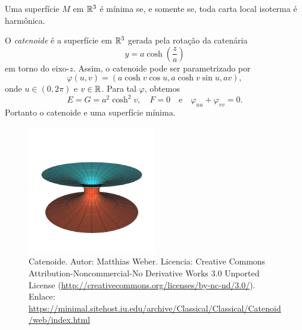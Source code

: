 \begin{corolario}\label{equiv_isoterma_harmonica}
	Uma superfície $M$ em $\mathbb{R}^3$ é mínima se, e somente se, toda carta local isoterma é harmônica.
\end{corolario}

\begin{exemplo}
	O \emph{catenoide} é a superfície em $\mathbb{R}^3$ gerada pela rotação da catenária 
	\begin{equation*}
	y = a \cosh \left( \frac{z}{a} \right)
	\end{equation*}
	em torno do eixo-$z$.
	Assim, o catenoide pode ser parametrizado por
	\begin{equation*}
	\varphi(u,v) = \left( a \cosh v \cos u, a \cosh v \sin u, av \right),
	\end{equation*}
	onde $u \in (0, 2 \pi)$ e $v \in \mathbb{R}$. Para tal $\varphi$, obtemos
	\begin{equation*}
	E = G = a^2 \cosh^2 v, \quad F = 0 \quad \text{e} \quad \varphi_{uu} + \varphi_{vv} = 0.
	\end{equation*}
	Portanto o catenoide e uma superfície mínima.
\end{exemplo}

\begin{figure}
	\centering
	\includegraphics[width=0.5\textwidth]{images/catenoid}
	\caption{Catenoide. Autor: Matthias Weber. Licencia: Creative Commons Attribution-Noncommercial-No Derivative Works 3.0 Unported License (\url{http://creativecommons.org/licenses/by-nc-nd/3.0/}). Enlace: \url{https://minimal.sitehost.iu.edu/archive/Classical/Classical/Catenoid/web/index.html}}
\end{figure}

